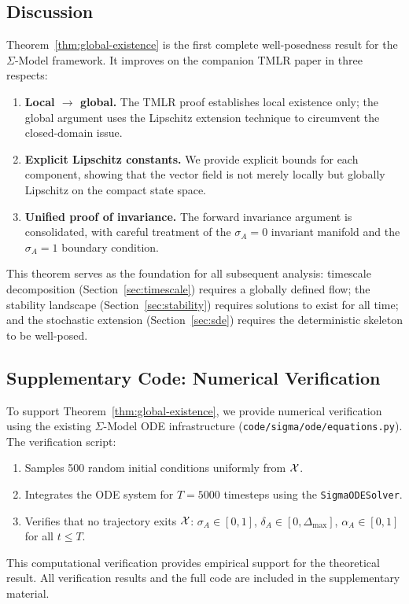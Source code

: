 \subsection{Discussion}

Theorem~\ref{thm:global-existence} is the first complete well-posedness
result for the $\Sigma$-Model framework. It improves on the companion
TMLR paper in three respects:

\begin{enumerate}
\item \textbf{Local $\to$ global.} The TMLR proof establishes local
  existence only; the global argument uses the Lipschitz extension
  technique to circumvent the closed-domain issue.
\item \textbf{Explicit Lipschitz constants.} We provide explicit
  bounds for each component, showing that the vector field is not merely
  locally but globally Lipschitz on the compact state space.
\item \textbf{Unified proof of invariance.} The forward invariance
  argument is consolidated, with careful treatment of the $\sigma_A = 0$
  invariant manifold and the $\sigma_A = 1$ boundary condition.
\end{enumerate}

This theorem serves as the foundation for all subsequent analysis:
timescale decomposition (Section~\ref{sec:timescale}) requires a globally
defined flow; the stability landscape (Section~\ref{sec:stability})
requires solutions to exist for all time; and the stochastic extension
(Section~\ref{sec:sde}) requires the deterministic skeleton to be
well-posed.

\subsection{Supplementary Code: Numerical Verification}

To support Theorem~\ref{thm:global-existence}, we provide numerical
verification using the existing $\Sigma$-Model ODE infrastructure
(\texttt{code/sigma/ode/equations.py}). The verification script:

\begin{enumerate}
\item Samples 500 random initial conditions uniformly from $\mathcal{X}$.
\item Integrates the ODE system for $T = 5000$ timesteps using the
  \texttt{SigmaODESolver}.
\item Verifies that no trajectory exits $\mathcal{X}$: $\sigma_A \in [0,1]$,
  $\delta_A \in [0, \Delta_{\max}]$, $\alpha_A \in [0,1]$ for all
  $t \leq T$.
\end{enumerate}

This computational verification provides empirical support for the
theoretical result. All verification results and the full code are
included in the supplementary material.
